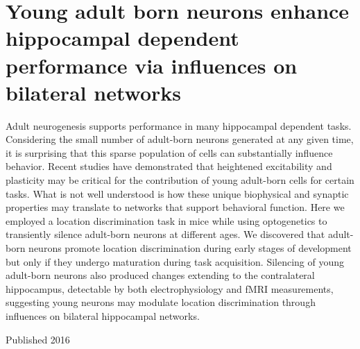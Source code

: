 \section*{Young adult born neurons enhance hippocampal dependent performance via influences on bilateral networks}

Adult neurogenesis supports performance in many hippocampal dependent tasks.
Considering the small number of adult-born neurons generated at any given time, it is surprising that this sparse population of cells can substantially influence behavior.
Recent studies have demonstrated that heightened excitability and plasticity may be critical for the contribution of young adult-born cells for certain tasks.
What is not well understood is how these unique biophysical and synaptic properties may translate to networks that support behavioral function.
Here we employed a location discrimination task in mice while using optogenetics to transiently silence adult-born neurons at different ages.
We discovered that adult-born neurons promote location discrimination during early stages of development but only if they undergo maturation during task acquisition.
Silencing of young adult-born neurons also produced changes extending to the contralateral hippocampus, detectable by both electrophysiology and fMRI measurements, suggesting young neurons may modulate location discrimination through influences on bilateral hippocampal networks.

Published 2016 \cite{Zhuo_2016}

